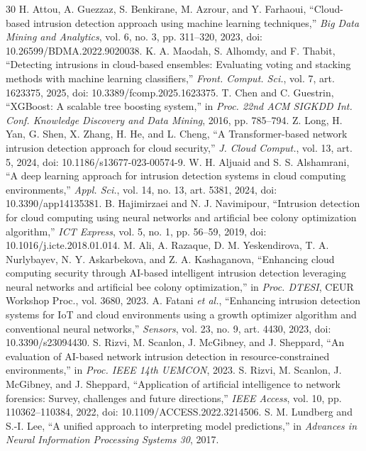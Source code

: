 \documentclass[conference]{IEEEtran}
\begin{document}
\begin{thebibliography}{30}
 H. Attou, A. Guezzaz, S. Benkirane, M. Azrour, and Y. Farhaoui, ``Cloud-based intrusion detection approach using machine learning techniques,'' \textit{Big Data Mining and Analytics}, vol. 6, no. 3, pp. 311--320, 2023, doi: 10.26599/BDMA.2022.9020038.
 K. A. Maodah, S. Alhomdy, and F. Thabit, ``Detecting intrusions in cloud-based ensembles: Evaluating voting and stacking methods with machine learning classifiers,'' \textit{Front. Comput. Sci.}, vol. 7, art. 1623375, 2025, doi: 10.3389/fcomp.2025.1623375.
 T. Chen and C. Guestrin, ``XGBoost: A scalable tree boosting system,'' in \textit{Proc. 22nd ACM SIGKDD Int. Conf. Knowledge Discovery and Data Mining}, 2016, pp. 785--794.
 Z. Long, H. Yan, G. Shen, X. Zhang, H. He, and L. Cheng, ``A Transformer-based network intrusion detection approach for cloud security,'' \textit{J. Cloud Comput.}, vol. 13, art. 5, 2024, doi: 10.1186/s13677-023-00574-9.
 W. H. Aljuaid and S. S. Alshamrani, ``A deep learning approach for intrusion detection systems in cloud computing environments,'' \textit{Appl. Sci.}, vol. 14, no. 13, art. 5381, 2024, doi: 10.3390/app14135381.
 B. Hajimirzaei and N. J. Navimipour, ``Intrusion detection for cloud computing using neural networks and artificial bee colony optimization algorithm,'' \textit{ICT Express}, vol. 5, no. 1, pp. 56--59, 2019, doi: 10.1016/j.icte.2018.01.014.
 M. Ali, A. Razaque, D. M. Yeskendirova, T. A. Nurlybayev, N. Y. Askarbekova, and Z. A. Kashaganova, ``Enhancing cloud computing security through AI-based intelligent intrusion detection leveraging neural networks and artificial bee colony optimization,'' in \textit{Proc. DTESI}, CEUR Workshop Proc., vol. 3680, 2023.
 A. Fatani \textit{et al.}, ``Enhancing intrusion detection systems for IoT and cloud environments using a growth optimizer algorithm and conventional neural networks,'' \textit{Sensors}, vol. 23, no. 9, art. 4430, 2023, doi: 10.3390/s23094430.
 S. Rizvi, M. Scanlon, J. McGibney, and J. Sheppard, ``An evaluation of AI-based network intrusion detection in resource-constrained environments,'' in \textit{Proc. IEEE 14th UEMCON}, 2023.
 S. Rizvi, M. Scanlon, J. McGibney, and J. Sheppard, ``Application of artificial intelligence to network forensics: Survey, challenges and future directions,'' \textit{IEEE Access}, vol. 10, pp. 110362--110384, 2022, doi: 10.1109/ACCESS.2022.3214506.
 S. M. Lundberg and S.-I. Lee, ``A unified approach to interpreting model predictions,'' in \textit{Advances in Neural Information Processing Systems 30}, 2017.

\end{thebibliography}
\end{document}
